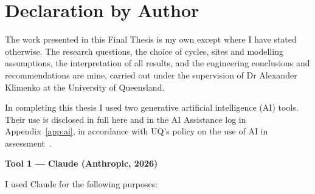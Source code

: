 \documentclass[12pt,a4paper]{report}
\begin{document}
\chapter*{Declaration by Author}
The work presented in this Final Thesis is my own except where I have stated
otherwise. The research questions, the choice of cycles, sites and modelling
assumptions, the interpretation of all results, and the engineering
conclusions and recommendations are mine, carried out under the supervision
of Dr Alexander Klimenko at the University of Queensland.

In completing this thesis I used two generative artificial intelligence (AI)
tools. Their use is disclosed in full here and in the AI Assistance log in
Appendix~\ref{app:ai}, in accordance with UQ's policy on the use of AI in
assessment~\cite{UQ2026AI}.

\bigskip
\noindent\textbf{Tool 1 --- Claude (Anthropic, 2026)~\cite{Anthropic2026}}

\noindent I used Claude for the following purposes:
\end{document}
